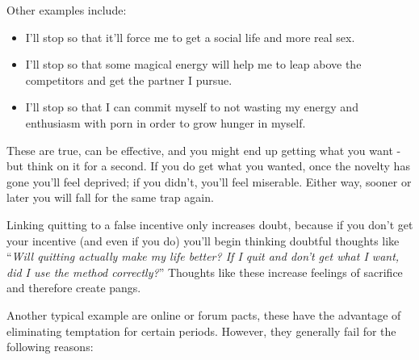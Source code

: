\documentclass[
]{book}
\begin{document}
Other examples include:

\begin{itemize}
\item
  I'll stop so that it'll force me to get a social life and more real sex.
\item
  I'll stop so that some magical energy will help me to leap above the competitors and get the partner I pursue.
\item
  I'll stop so that I can commit myself to not wasting my energy and enthusiasm with porn in order to grow hunger in myself.
\end{itemize}

These are true, can be effective, and you might end up getting what you want - but think on it for a second. If you do get what you wanted, once the novelty has gone you'll feel deprived; if you didn't, you'll feel miserable. Either way, sooner or later you will fall for the same trap again.

Linking quitting to a false incentive only increases doubt, because if you don't get your incentive (and even if you do) you'll begin thinking doubtful thoughts like ``\emph{Will quitting actually make my life better? If I quit and don't get what I want, did I use the method correctly?}'' Thoughts like these increase feelings of sacrifice and therefore create pangs.

Another typical example are online or forum pacts, these have the advantage of eliminating temptation for certain periods. However, they generally fail for the following reasons:
\end{document}

